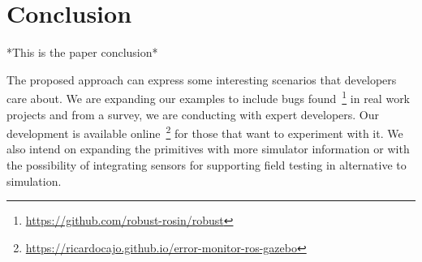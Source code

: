 \chapter{Conclusion}
\label{chap:conclusion}

*This is the paper conclusion*

The proposed approach can express some interesting scenarios that developers care about. We are expanding our examples to include bugs found~\footnote{\url{https://github.com/robust-rosin/robust}} in real work projects and from a survey, we are conducting with expert developers. Our development is available online~\footnote{\url{https://ricardocajo.github.io/error-monitor-ros-gazebo}} for those that want to experiment with it. We also intend on expanding the primitives with more simulator information or with the possibility of integrating sensors for supporting field testing in alternative to simulation.